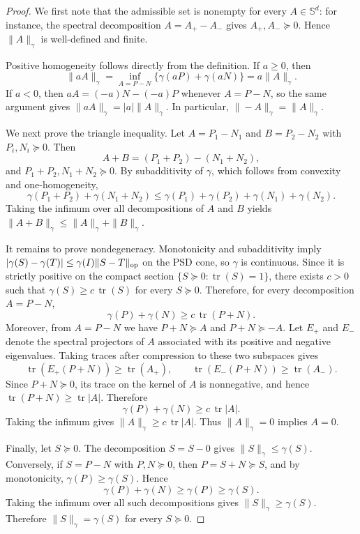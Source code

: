 \documentclass{article}
\newcommand{\tr}{\operatorname{tr}}
\begin{document}
\begin{proof}
We first note that the admissible set is nonempty for every
$A\in\mathbb S^d$: for instance, the spectral decomposition
$A=A_+-A_-$ gives $A_+,A_-\succeq0$. Hence $\|A\|_\gamma$ is well-defined and
finite.

Positive homogeneity follows directly from the definition. If $a\ge0$, then
\[
    \|aA\|_\gamma
    =
    \inf_{A=P-N}
    \{\gamma(aP)+\gamma(aN)\}
    =
    a\|A\|_\gamma.
\]
If $a<0$, then $aA=(-a)N-(-a)P$ whenever $A=P-N$, so the same argument gives
$\|aA\|_\gamma=|a|\|A\|_\gamma$. In particular, $\|-A\|_\gamma=\|A\|_\gamma$.

We next prove the triangle inequality. Let $A=P_1-N_1$ and $B=P_2-N_2$ with
$P_i,N_i\succeq0$. Then
\[
    A+B=(P_1+P_2)-(N_1+N_2),
\]
and $P_1+P_2,N_1+N_2\succeq0$. By subadditivity of $\gamma$, which follows
from convexity and one-homogeneity,
\[
    \gamma(P_1+P_2)+\gamma(N_1+N_2)
    \le
    \gamma(P_1)+\gamma(P_2)+\gamma(N_1)+\gamma(N_2).
\]
Taking the infimum over all decompositions of $A$ and $B$ yields
$\|A+B\|_\gamma\le\|A\|_\gamma+\|B\|_\gamma$.

It remains to prove nondegeneracy. Monotonicity and subadditivity imply
$|\gamma(S)-\gamma(T)|\le\gamma(I)\|S-T\|_{\rm op}$ on the PSD cone,
so $\gamma$ is continuous. Since it is strictly positive on the
compact section $\{S\succeq0:\tr(S)=1\}$, there exists $c>0$ such that
$\gamma(S)\ge c\,\tr(S)$ for every $S\succeq0$. Therefore, for every
decomposition $A=P-N$,
\[
    \gamma(P)+\gamma(N)
    \ge
    c\,\tr(P+N).
\]
Moreover, from $A=P-N$ we have $P+N\succeq A$ and $P+N\succeq -A$. Let
$E_+$ and $E_-$ denote the spectral projectors of $A$ associated with its
positive and negative eigenvalues. Taking traces after compression to these
two subspaces gives
\[
 \tr(E_+(P+N))\ge\tr(A_+),
 \qquad
 \tr(E_-(P+N))\ge\tr(A_-).
\]
Since $P+N\succeq0$, its trace on the kernel of $A$ is nonnegative, and hence
$\tr(P+N)\ge\tr|A|$. Therefore
\[
    \gamma(P)+\gamma(N)\ge c\,\tr|A|.
\]
Taking the infimum gives $\|A\|_\gamma\ge c\,\tr|A|$. Thus
$\|A\|_\gamma=0$ implies $A=0$.

Finally, let $S\succeq0$. The decomposition $S=S-0$ gives
$\|S\|_\gamma\le\gamma(S)$. Conversely, if $S=P-N$ with $P,N\succeq0$, then
$P=S+N\succeq S$, and by monotonicity,
$\gamma(P)\ge\gamma(S)$. Hence
\[
    \gamma(P)+\gamma(N)\ge\gamma(P)\ge\gamma(S).
\]
Taking the infimum over all such decompositions gives
$\|S\|_\gamma\ge\gamma(S)$. Therefore $\|S\|_\gamma=\gamma(S)$ for every
$S\succeq0$.
\end{proof}
\end{document}

